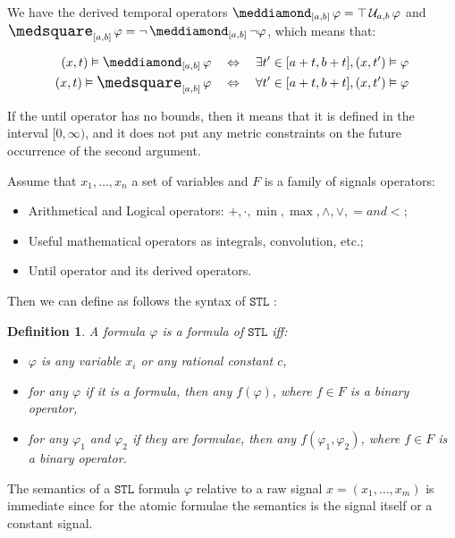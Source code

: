 \documentclass{suftesi}
\newtheorem*{definition}{Definition}
\newcommand{\STL}{$\mathtt{STL}$ }
\begin{document}
We have the derived temporal operators $\pos_{[a,b]}\varphi = \top\,\mathcal{U}_{a,b}\,\varphi$ and $\nec_{[a,b]}\varphi = \lnot\pos_{[a,b]}\lnot\varphi$, which means that:

\begin{align*}
     (x,t)\vDash\pos_{[a,b]}\varphi &\quad\Leftrightarrow \quad\exists t'\in [a+t,b+t], (x,t')\vDash \varphi\\
     (x,t)\vDash\nec_{[a,b]}\varphi     &\quad\Leftrightarrow \quad\forall t'\in [a+t,b+t], (x,t')\vDash \varphi
\end{align*}

If the until operator has no bounds, then it means that it is defined in the interval $[0,\infty)$, and it does not put any metric constraints on the future occurrence of the second argument.

Assume that $x_1,\dots,x_n$ a set of variables and $F$ is a family of signals operators:

\begin{itemize}[leftmargin=0.5cm]
    \item Arithmetical and Logical operators: $+,\cdot,\min,\max,\land,\lor,= and <$;
    \item Useful mathematical operators as integrals, convolution, etc.;
    \item Until operator and its derived operators.
\end{itemize}

Then we can define as follows the syntax of \STL:

\begin{definition}
    A formula $\varphi$ is a formula of \STL iff:
    \begin{itemize}[leftmargin=0.5cm]
        \item $\varphi$ is any variable $x_i$ or any rational constant $c$,
        \item for any $\varphi$ if it is a formula, then any $f(\varphi)$, where $f\in F$ is a binary operator,
        \item for any $\varphi_1$ and $\varphi_2$ if they are formulae, then any $f(\varphi_1, \varphi_2)$, where $f\in F$ is a binary operator.
    \end{itemize}
\end{definition}

The semantics of a \STL formula $\varphi$ relative to a raw signal $x=(x_1,\dots,x_m)$ is immediate since for the atomic formulae the semantics is the signal itself or a constant signal.
\end{document}

